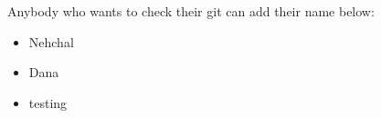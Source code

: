 \documentclass[11pt]{article}
\begin{document}
Anybody who wants to check their git can add their name below:
\begin{itemize}
    \item Nehchal
    \item Dana
    \item testing
\end{itemize}
\end{document}
